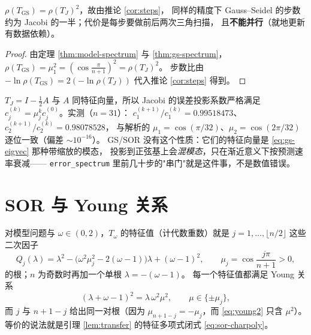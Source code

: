 \begin{corollary}
\label{cor:gs-half}
$\rho(T_{\mathrm{GS}})=\rho(T_J)^2$，故由推论 \ref{cor:steps}，
同样的精度下 Gauss--Seidel 的步数约为 Jacobi 的一半；代价是每步要做前后两次三角扫描，
且\textbf{不能并行}（就地更新有数据依赖）。
\end{corollary}

\begin{proof}
由定理 \ref{thm:model-spectrum} 与 \ref{thm:gs-spectrum}，
$\rho(T_{\mathrm{GS}})=\mu_1^2=(\cos\frac{\pi}{n+1})^2=\rho(T_J)^2$。
步数比由 $-\ln\rho(T_{\mathrm{GS}})=2(-\ln\rho(T_J))$ 代入推论 \ref{cor:steps} 得到。
\end{proof}

\begin{remark}
\label{rem:modes}
$T_J=I-\frac12A$ 与 $A$ 同特征向量，所以 Jacobi 的误差投影系数严格满足
$c_j^{(k)}=\mu_j^kc_j^{(0)}$。实测（$n=31$）：
$c_1^{(k+1)}/c_1^{(k)}=0.99518473$、$c_2^{(k+1)}/c_2^{(k)}=0.98078528$，
与解析的 $\mu_1=\cos(\pi/32)$、$\mu_2=\cos(2\pi/32)$ 逐位一致（偏差 $\sim10^{-16}$）。
GS/SOR 没有这个性质：它们的特征向量是 \eqref{eq:gs-eigvec} 那种带缩放的模态，
投影到正弦基上会\emph{混模态}，只在渐近意义下按预测速率衰减——
\texttt{error\_spectrum} 里前几十步的"串门"就是这件事，不是数值错误。
\end{remark}

\section{SOR 与 Young 关系}
\label{sec:sor}

\begin{theorem}
\label{thm:sor-spectrum}
对模型问题与 $\omega\in(0,2)$，$T_\omega$ 的特征值（计代数重数）就是
$j=1,\dots,\lfloor n/2\rfloor$ 这些二次因子
\begin{equation}
  Q_j(\lambda)=\lambda^2-\bigl(\omega^2\mu_j^2-2(\omega-1)\bigr)\lambda+(\omega-1)^2,
  \qquad \mu_j=\cos\frac{j\pi}{n+1}>0,
  \label{eq:Qj}
\end{equation}
的根；$n$ 为奇数时再加一个单根 $\lambda=-(\omega-1)$。
每一个特征值都满足 Young 关系
\begin{equation}
  (\lambda+\omega-1)^2=\lambda\,\omega^2\mu^2,\qquad \mu\in\{\pm\mu_j\},
  \label{eq:young2}
\end{equation}
而 $j$ 与 $n+1-j$ 给出同一对根（因为 $\mu_{n+1-j}=-\mu_j$，而 \eqref{eq:young2} 只含 $\mu^2$）。
等价的说法就是引理 \ref{lem:transfer} 的特征多项式闭式 \eqref{eq:sor-charpoly}。
\end{theorem}

